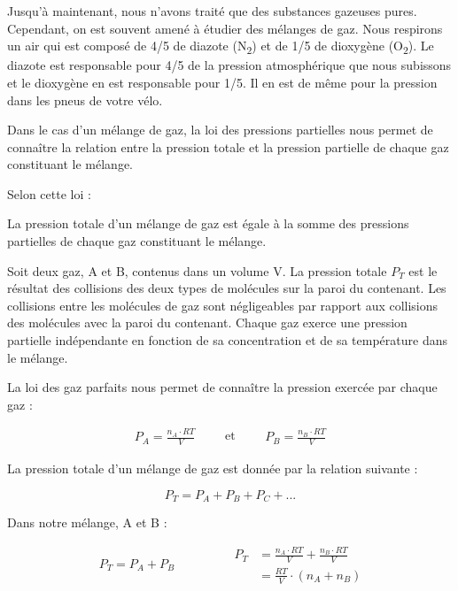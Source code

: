 \documentclass[
  11pt,
  a4paper,
  openany]{book}
\begin{document}
Jusqu'à maintenant, nous n'avons traité que des substances gazeuses pures. Cependant, on est souvent amené à étudier des mélanges de gaz. Nous respirons un air qui est composé de 4/5 de diazote (N\textsubscript{2}) et de 1/5 de dioxygène (O\textsubscript{2}). Le diazote est responsable pour 4/5 de la pression atmosphérique que nous subissons et le dioxygène en est responsable pour 1/5. Il en est de même pour la pression dans les pneus de votre vélo.

Dans le cas d'un mélange de gaz, la loi des pressions partielles nous permet de connaître la relation entre la pression totale et la pression partielle de chaque gaz constituant le mélange.

Selon cette loi :

\begin{tcolorbox}
La pression totale d'un mélange de gaz est égale à la somme des pressions partielles de chaque gaz constituant le mélange.

\end{tcolorbox}

Soit deux gaz, A et B, contenus dans un volume V. La pression totale \(P_T\) est le résultat des collisions des deux types de molécules sur la paroi du contenant. Les collisions entre les molécules de gaz sont négligeables par rapport aux collisions des molécules avec la paroi du contenant. Chaque gaz exerce une pression partielle indépendante en fonction de sa concentration et de sa température dans le mélange.

La loi des gaz parfaits nous permet de connaître la pression exercée par chaque gaz :

\[
\begin{split}
  P_A = \frac{n_A \cdot RT }{V}
\end{split}
\qquad\text{et}\qquad
\begin{split}
  P_B = \frac{n_B \cdot RT }{V}
\end{split}
\]

La pression totale d'un mélange de gaz est donnée par la relation suivante :

\[
P_T = P_A + P_B + P_C + ...
\]

Dans notre mélange, A et B :

\[
\begin{split}
P_T = P_A + P_B
\end{split}
\qquad\qquad
\begin{split}
  P_T &= \frac{n_A \cdot RT }{V} + \frac{n_B \cdot RT }{V} \\
  &= \frac{RT }{V} \cdot (n_A + n_B)
\end{split}
\]
\end{document}
